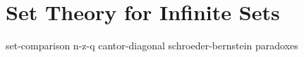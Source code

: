 \chapter{Set Theory for Infinite
Sets}\label{chap:set-theory}

{set-comparison}
{n-z-q}
{cantor-diagonal}
{schroeder-bernstein}
{paradoxes}